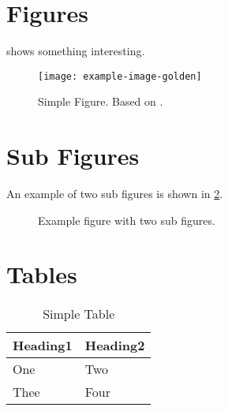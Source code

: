 \documentclass[
  numbers=noenddot,
  english,  %
  a4paper,  %
  twoside,  %
  bibliography=totoc,
  headsepline,
  cleardoublepage=empty,
  parskip=half,
  draft=false
]{scrbook}
\theoremstyle{break}
\begin{document}
\section{Figures}

\begin{ltgexample}
 shows something interesting.

\begin{figure}
  \centering
  \texttt{[image: example-image-golden]}
  \caption[Simple Figure]{
    Simple Figure.
    Based on \citet{mwe}.
  }
  \label{fig:label}
\end{figure}
\end{ltgexample}

\section{Sub Figures}

An example of two sub figures is shown in \cref{fig:two_sub_figures}.

\begin{ltgexample}
\begin{figure}[!b]
  \centering
  \hfil
  \caption{Example figure with two sub figures.}
  \label{fig:two_sub_figures}
\end{figure}
\end{ltgexample}

\section{Tables}

\begin{ltgexample}
\begin{table}
  \caption{Simple Table}
  \label{tab:simple}
  \centering
  \begin{tabular}{ll}
    \toprule
    Heading1 & Heading2 \\
    \midrule
    One      & Two      \\
    Thee     & Four     \\
    \bottomrule
  \end{tabular}
\end{table}
\end{ltgexample}
\end{document}
